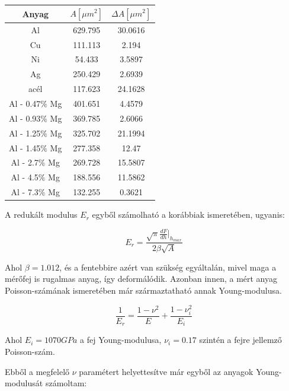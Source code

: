 \documentclass[a4paper,12pt]{article}
\begin{document}
\begin{center}
\begin{tabular}{|c|c|c|}
\hline
Anyag & $A [\mu m^{2}]$ & $\Delta A [\mu m^{2}]$ \\
\hline
Al &629.795& 30.0616 \\
\hline
Cu &111.113& 2.194 \\
\hline
Ni& 54.433& 3.5897 \\
\hline
Ag &250.429& 2.6939\\
\hline
acél &117.623& 24.1628\\
\hline
Al - 0.47$\%$ Mg & 401.651& 4.4579\\
\hline
Al - 0.93$\%$ Mg& 369.785 &2.6066\\
\hline
Al - 1.25$\%$ Mg& 325.702 &21.1994\\
\hline
Al - 1.45$\%$ Mg& 277.358 &12.47\\
\hline
Al - 2.7$\%$ Mg &269.728& 15.5807\\
\hline
Al - 4.5$\%$ Mg &188.556 &11.5862\\
\hline
Al - 7.3$\%$ Mg &132.255 &0.3621\\
\hline
\end{tabular}
\end{center}

\par A redukált modulus $E_{r}$ egyből számolható a korábbiak ismeretében, ugyanis:

\begin{equation*}
E_{r} = \frac{\sqrt{\pi}\frac{dF}{dh}|_{h_{max}}}{2\beta\sqrt{A}}
\end{equation*}

\par Ahol $\beta = 1.012$, és a fentebbire azért van szükség egyáltalán, mivel maga a mérőfej is rugalmas anyag, így deformálódik. Azonban innen, a mért anyag Poisson-számának ismeretében már származtatható annak Young-modulusa.

\begin{equation*}
\frac{1}{E_{r}} = \frac{1 - \nu^{2}}{E} + \frac{1-\nu^{2}_{i}}{E_{i}}
\end{equation*}

\par Ahol $E_{i} = 1070 GPa$ a fej Young-modulusa, $\nu_{i} = 0.17$ szintén a fejre jellemző Poisson-szám.

\par Ebből a megfelelő $\nu$ paramétert helyettesítve már egyből az anyagok Young-modulusát számoltam:
\end{document}

